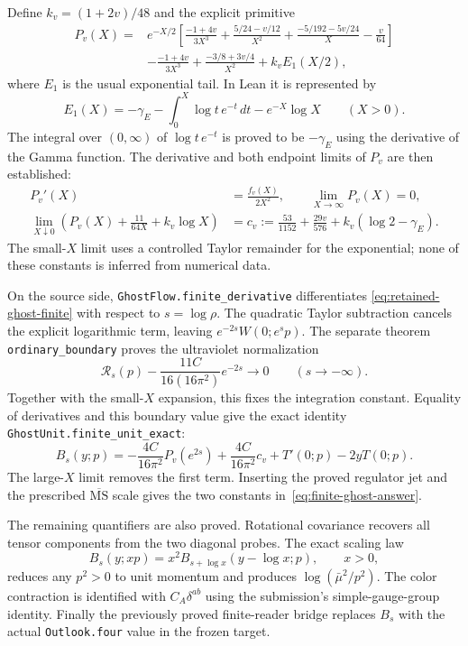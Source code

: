 \documentclass[11pt]{article}
\newcommand{\MS}{\overline{\mathrm{MS}}}
\newcommand{\code}[1]{{\small\nolinkurl{#1}}}
\begin{document}
Define $k_v=(1+2v)/48$ and the explicit primitive
\begin{align*}
 P_v(X)={}&e^{-X/2}\left[
 \frac{-1+4v}{3X^3}+\frac{5/24-v/12}{X^2}
 +\frac{-5/192-5v/24}{X}-\frac v{64}\right]\\
 &-\frac{-1+4v}{3X^3}+\frac{-3/8+3v/4}{X^2}
       +k_v E_1(X/2),
\end{align*}
where $E_1$ is the usual exponential tail. In Lean it is represented by
\[
 E_1(X)=-\gamma_E-\int_0^X\log t\,e^{-t}\,dt-e^{-X}\log X
 \qquad(X>0).
\]
The integral over $(0,\infty)$ of $\log t\,e^{-t}$ is proved to be
$-\gamma_E$ using the derivative of the Gamma function. The derivative
and both endpoint limits of $P_v$ are then established:
\begin{align*}
 P_v'(X)&=\frac{f_v(X)}{2X^2},\qquad
 \lim_{X\to\infty}P_v(X)=0,\\
 \lim_{X\downarrow0}\left(P_v(X)+\frac{11}{64X}+k_v\log X\right)
 &=c_v:=\frac{53}{1152}+\frac{29v}{576}
                     +k_v(\log2-\gamma_E).
\end{align*}
The small-$X$ limit uses a controlled Taylor remainder for the
exponential; none of these constants is inferred from numerical data.

On the source side, \code{GhostFlow.finite_derivative} differentiates
\eqref{eq:retained-ghost-finite} with respect to $s=\log\rho$.
The quadratic Taylor subtraction cancels the explicit logarithmic
term, leaving $e^{-2s}W(0;e^sp)$. The separate theorem
\code{ordinary_boundary} proves the ultraviolet normalization
\[
 \mathcal R_s(p)-\frac{11C}{16(16\pi^2)}e^{-2s}\longrightarrow0
 \qquad(s\to-\infty).
\]
Together with the small-$X$ expansion, this fixes the integration
constant. Equality of derivatives and this boundary value give the
exact identity \code{GhostUnit.finite_unit_exact}:
\begin{equation}\label{eq:finite-cutoff-primitive}
 B_s(y;p)=-\frac{4C}{16\pi^2}P_v(e^{2s})
          +\frac{4C}{16\pi^2}c_v+T'(0;p)-2yT(0;p).
\end{equation}
The large-$X$ limit removes the first term. Inserting the proved
regulator jet and the prescribed $\MS$ scale gives the two constants
in~\eqref{eq:finite-ghost-answer}.

The remaining quantifiers are also proved. Rotational covariance
recovers all tensor components from the two diagonal probes. The exact
scaling law
\[
 B_s(y;xp)=x^2 B_{s+\log x}(y-\log x;p),\qquad x>0,
\]
reduces any $p^2>0$ to unit momentum and produces $\log(\bar\mu^2/p^2)$.
The color contraction is identified with $C_A\delta^{ab}$ using the
submission's simple-gauge-group identity. Finally the previously
proved finite-reader bridge replaces $B_s$ with the actual
\code{Outlook.four} value in the frozen target.
\end{document}
